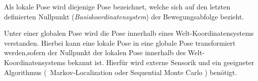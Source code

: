 Als lokale Pose wird diejenige Pose bezeichnet, welche sich auf den letzten definierten Nullpunkt (\textit{Basiskoordinatensystem}) der Bewegungsabfolge bezieht.\\


Unter einer globalen Pose wird die Pose innerhalb eines Welt-Koordinatensystems verstanden. Hierbei kann eine lokale Pose in eine globale Pose transformiert werden,sofern der Nullpunkt der lokalen Pose innerhalb des Welt-Koordinatensystems bekannt ist. Hierfür wird externe Sensorik und ein geeigneter Algorithmus (\zB\ Markov-Localization oder Sequential Monte Carlo ) benötigt.










